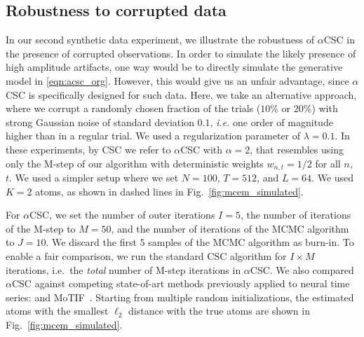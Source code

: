 \subsection{Robustness to corrupted data} 
In our second synthetic data experiment, we illustrate the robustness of $\alpha$CSC in the presence of corrupted observations.
%
In order to simulate the likely presence of high amplitude artifacts, one way would be to directly simulate the generative model in \eqref{eqn:acsc_org}. However, this would give us an unfair advantage, since $\alpha$CSC is specifically designed for such data. Here, we take an alternative approach, where we corrupt a randomly chosen fraction of the trials ($10\%$ or $20\%$) with strong Gaussian noise of standard deviation $0.1$, \textit{i.e.} one order of magnitude higher than in a regular trial. We used a regularization parameter of $\lambda = 0.1$.
%
In these experiments, by CSC we refer to $\alpha$CSC with $\alpha=2$, that resembles using only the M-step of our algorithm with deterministic weights $w_{n,t}=1/2$ for all $n$, $t$. We used a simpler setup where we set $N=100$, $T=512$, and $L=64$. We used $K=2$ atoms, as shown in dashed lines in Fig.~\ref{fig:mcem_simulated}.

%

%
For $\alpha$CSC, we set the number of outer iterations $I=5$, the number of iterations of the M-step to $M=50$, and the number of iterations of the MCMC algorithm to $J=10$. We discard the first $5$ samples of the MCMC algorithm as burn-in.
%
%
To enable a fair comparison, we run the standard CSC algorithm for $I\times M$ iterations, i.e.\ the \emph{total} number of M-step iterations in $\alpha$CSC. We also compared $\alpha$CSC against competing state-of-art methods previously applied to neural time series: \citet{brockmeier2016learning} and MoTIF~\citep{jost2006motif}. 
%
Starting from multiple random initializations, the estimated atoms with the smallest $\ell_2$ distance with the true atoms are shown in Fig.~\ref{fig:mcem_simulated}.

